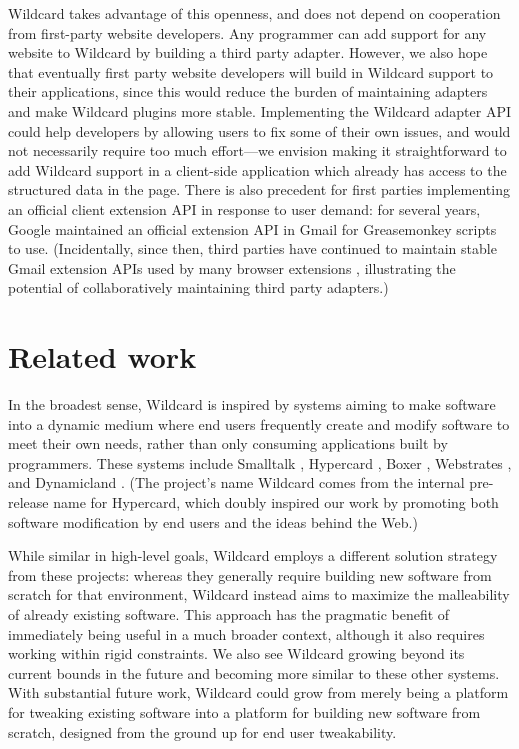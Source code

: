 \documentclass[english,submission]{programming}
\begin{document}
Wildcard takes advantage of this openness, and does not depend on
cooperation from first-party website developers. Any programmer can add
support for any website to Wildcard by building a third party adapter.
However, we also hope that eventually first party website developers
will build in Wildcard support to their applications, since this would
reduce the burden of maintaining adapters and make Wildcard plugins more
stable. Implementing the Wildcard adapter API could help developers by
allowing users to fix some of their own issues, and would not
necessarily require too much effort---we envision making it
straightforward to add Wildcard support in a client-side application
which already has access to the structured data in the page. There is
also precedent for first parties implementing an official client
extension API in response to user demand: for several years, Google
maintained an official extension API in Gmail for Greasemonkey scripts
to use. (Incidentally, since then, third parties have continued to
maintain stable Gmail extension APIs used by many browser extensions
\autocite{streak,talwar2019}, illustrating the potential of
collaboratively maintaining third party adapters.)

\hypertarget{related-work}{%
\section{Related work}\label{related-work}}

In the broadest sense, Wildcard is inspired by systems aiming to make
software into a dynamic medium where end users frequently create and
modify software to meet their own needs, rather than only consuming
applications built by programmers. These systems include Smalltalk
\autocite{kay1977}, Hypercard \autocite{hypercard2019}, Boxer
\autocite{disessa1986}, Webstrates \autocite{klokmose2015}, and
Dynamicland \autocite{victor}. (The project's name Wildcard comes from
the internal pre-release name for Hypercard, which doubly inspired our
work by promoting both software modification by end users and the ideas
behind the Web.)

While similar in high-level goals, Wildcard employs a different solution
strategy from these projects: whereas they generally require building
new software from scratch for that environment, Wildcard instead aims to
maximize the malleability of already existing software. This approach
has the pragmatic benefit of immediately being useful in a much broader
context, although it also requires working within rigid constraints. We
also see Wildcard growing beyond its current bounds in the future and
becoming more similar to these other systems. With substantial future
work, Wildcard could grow from merely being a platform for tweaking
existing software into a platform for building new software from
scratch, designed from the ground up for end user tweakability.
\end{document}
